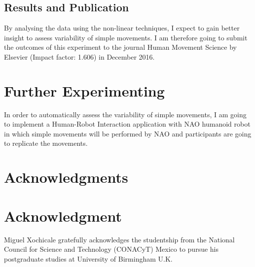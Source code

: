 \documentclass[9pt,journal,onecolumn,compsoc]{IEEEtran}
\begin{document}
\subsection{Results and Publication}
By analysing the data using the non-linear techniques, I expect to
gain better insight to assess variability of simple movements.
I am therefore going to submit the outcomes of this experiment to
the journal Human Movement Science by Elsevier (Impact factor: 1.606) in December 2016.


\section{Further Experimenting}

In order to automatically assess the variability of simple movements, 
I am going to implement a Human-Robot Interaction application 
with NAO humanoid robot \cite{NAO}
in which simple movements will be performed by NAO 
and participants are going to replicate the movements.


\ifCLASSOPTIONcompsoc
  \section*{Acknowledgments}
\else
  \section*{Acknowledgment}
\fi

Miguel Xochicale gratefully acknowledges the studentship from 
the National Council for Science and Technology (CONACyT) Mexico
to pursue his postgraduate studies at University of Birmingham U.K.

\ifCLASSOPTIONcaptionsoff
  \newpage
\fi





%
%
%
% 
% 
\end{document}
